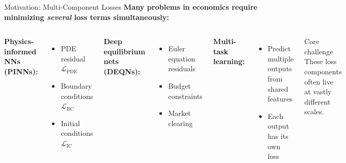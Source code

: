 \documentclass[aspectratio=169,11pt]{beamer}
\newcommand{\emphc}[1]{\textcolor{harvardcrimson}{#1}}
\begin{document}
\begin{frame}{Motivation: Multi-Component Losses}
\textbf{Many problems in economics require minimizing \emph{several} loss terms simultaneously:}

\vspace{0.3cm}
\begin{columns}[T]
\textbf{Physics-informed NNs (PINNs):}
\begin{itemize}
    \item PDE residual $\mathcal{L}_\text{PDE}$
    \item Boundary conditions $\mathcal{L}_\text{BC}$
    \item Initial conditions $\mathcal{L}_\text{IC}$
\end{itemize}

\vspace{0.3cm}
\textbf{Deep equilibrium nets (DEQNs):}
\begin{itemize}
    \item Euler equation residuals
    \item Budget constraints
    \item Market clearing
\end{itemize}

\textbf{Multi-task learning:}
\begin{itemize}
    \item Predict multiple outputs from shared features
    \item Each output has its own loss
\end{itemize}

\vspace{0.3cm}
\begin{alertblock}{Core challenge}
These loss components often live at \emphc{vastly different scales}.
\end{alertblock}
\end{columns}
\end{frame}
\end{document}
